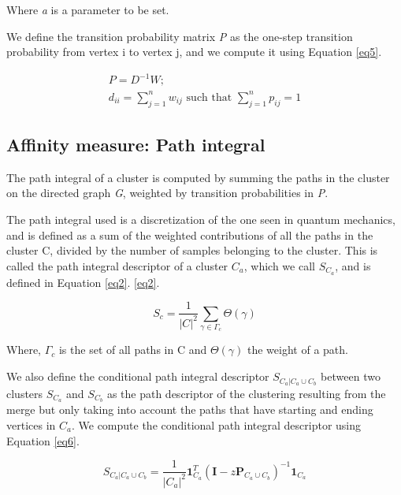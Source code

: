 \documentclass[
	10pt,
	parskip=half-,	
	paper=a4,
	english
	]{scrartcl}
\begin{document}
Where \textit{a} is a parameter to be set.

We define the transition probability matrix \textit{P} as the one-step transition probability from vertex i to vertex j, and we compute it using Equation \ref{eq5}.

\begin{equation}
    \begin{split}
    P = D^{-1}W; 
    \\
    d_{ii} = \sum_{j=1}^n w_{ij}
    \text{ such that }
    \sum_{j=1}^n p_{ij}=1
    \end{split}
    \label{eq5}
\end{equation}

\subsection{Affinity measure: Path integral}

The path integral of a cluster is computed by summing the paths in the cluster on the directed graph \textit{G}, weighted by transition probabilities in \textit{P}.

The path integral used is a discretization of the one seen in quantum mechanics, and is defined as a sum of the weighted contributions of all the paths in the cluster C, divided by the number of samples belonging to the cluster. This is called the path integral descriptor of a cluster \(C_a\), which we call \(S_{C_a}\), and is defined in Equation \ref{eq2}.
\ref{eq2}.

\begin{equation}
    S_c = \frac{1}{|C|^2}\sum_{\gamma\in\Gamma_c}{\Theta(\gamma)}
\label{eq2}
\end{equation}

Where, \(\Gamma_c\) is the set of all paths in C and \(\Theta(\gamma)\) the weight of a path.

We also define the conditional path integral descriptor \(S_{C_a|C_a\cup C_b}\) between two clusters \(S_{C_a}\) and \(S_{C_b}\) as the path descriptor of the clustering resulting from the merge but only taking into account the paths that have starting and ending vertices in \(C_a\). We compute the conditional path integral descriptor using Equation \ref{eq6}.

\begin{equation}
    S_{C_a|C_a\cup C_b} = \frac{1}{|C_a|^2} \boldsymbol{1}_{C_a}^{T}(\boldsymbol{I}-z\boldsymbol{P}_{C_a\cup C_b})^{-1}\boldsymbol{1}_{C_a}
    \label{eq6}
\end{equation}
\end{document}
